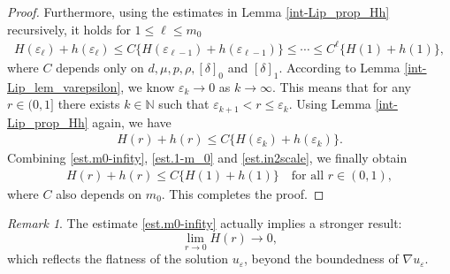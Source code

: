 \documentclass[reqno,12pt]{amsart} %
\theoremstyle{definition}
\theoremstyle{remark}
\newtheorem{remark}[theorem]{Remark}
\numberwithin{equation}{section}
\newcommand{\e}{\varepsilon}
\newcommand{\jz}[1]{\textcolor{red}{#1}}
\begin{document}
\begin{proof}
Furthermore, using the estimates in Lemma \ref{int-Lip_prop_Hh} recursively, it holds for $1\leq \ell\leq m_0$
  \begin{align}\label{est.1-m_0}
    H(\varepsilon_{\ell})+h(\varepsilon_{\ell})\leq C\{H(\varepsilon_{\ell-1})+h(\varepsilon_{\ell-1})\}\leq\cdots\leq  C^{\ell}\{H(1)+h(1)\}, 
  \end{align}
  where $C$ depends only on $d, \mu, p, \rho, [\delta]_0$ and $[\delta]_1$. According to Lemma \ref{int-Lip_lem_varepsilon}, we know $\varepsilon_k\rightarrow 0$ as $k\rightarrow\infty$. This means that for any $r\in (0, 1]$ there exists $k\in\mathbb{N}$ such that $\varepsilon_{k+1}<r\leq \varepsilon_k$. Using Lemma \ref{int-Lip_prop_Hh} again, we have
  \begin{align}\label{est.in2scale}
    H(r)+h(r)\leq C\{H(\varepsilon_k)+h(\varepsilon_k)\}. 
  \end{align}
Combining \eqref{est.m0-infity}, \eqref{est.1-m_0} and \eqref{est.in2scale}, we finally obtain
  \begin{align*}
    H(r)+h(r)\leq C\{H(1)+h(1)\}\quad\text{for all } r\in (0,1), 
  \end{align*}
  where $C$ also depends on $m_0$. This completes the proof.
\end{proof}

\begin{remark}
    The estimate \eqref{est.m0-infity} actually implies a stronger result: 
    $$\lim_{r\to 0} H(r) \to 0, $$
    which reflects the flatness of the solution $u_\e$, beyond the boundedness of $\nabla u_\e$.  %
\end{remark}
\end{document}

